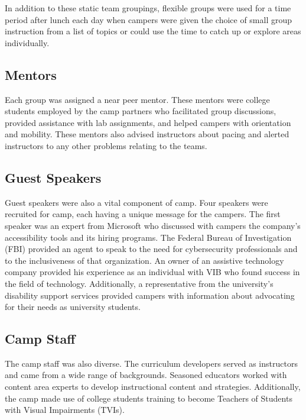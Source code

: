 \documentclass[11.5pt]{sig-alternate} %
\begin{document}
\begin{large}
In addition to these static team groupings, flexible groups were used for a time period after lunch each day when campers were given the choice of small group instruction from a list of topics or could use the time to catch up or explore areas individually.

\subsection*{Mentors}

Each group was assigned a near peer mentor. These mentors were college students employed by the camp partners who facilitated group discussions, provided assistance with lab assignments, and helped campers with orientation and mobility. These mentors also advised instructors about pacing and alerted instructors to any other problems relating to the teams.

\subsection*{Guest Speakers}

Guest speakers were also a vital component of camp. Four speakers were recruited for camp, each having a unique message for the campers. The first speaker was an expert from Microsoft who discussed with campers the company’s accessibility tools and its hiring programs. The Federal Bureau of Investigation (FBI) provided an agent to speak to the need for cybersecurity professionals and to the inclusiveness of that organization. An owner of an assistive technology company provided his experience as an individual with VIB who found success in the field of technology. Additionally, a representative from the university's disability support services provided campers with information about advocating for their needs as university students.

\subsection*{Camp Staff}
 
 The camp staff was also diverse. The curriculum developers served as instructors and came from a wide range of backgrounds. Seasoned educators worked with content area experts to develop instructional content and strategies. Additionally, the camp made use of college students training to become Teachers of Students with Visual Impairments (TVIs).


\end{large}
\end{document}
